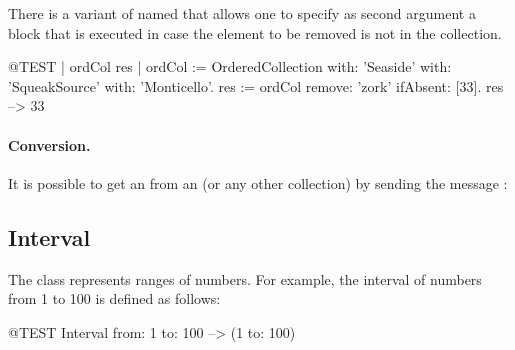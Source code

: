 \documentclass[a4paper,10pt,twoside]{book}
\begin{document}
There is a variant of  named  that allows one to specify 
as second argument a block that is executed in case the element to be removed is not in the collection. 

\begin{code}{@TEST | ordCol res | ordCol := OrderedCollection with: 'Seaside' with: 'SqueakSource' with: 'Monticello'.}
res := ordCol remove: 'zork' ifAbsent: [33].
res --> 33
\end{code}

\paragraph{Conversion.}
It is possible to get an  from an  (or any other collection) by sending the message :






\subsection{Interval}
The class  represents ranges of numbers. For example, the interval of numbers from 1 to 100 is defined as follows:
\begin{code}{@TEST}
Interval from: 1 to: 100 --> (1 to: 100)
\end{code}
\end{document}
